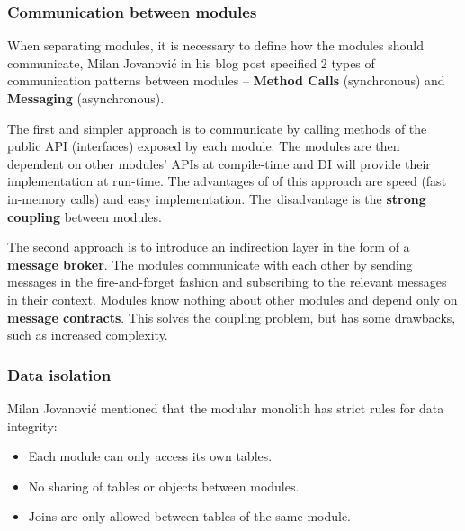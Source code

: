 \subsubsection{Communication between modules}
When separating modules, it is necessary to define how the modules should communicate, Milan Jovanović in his blog post \cite{milan_jovanovic:modular_monolith_communication_patterns} specified 2 types of communication patterns between modules -- \textbf{Method Calls} (synchronous) and \textbf{Messaging} (asynchronous).

The first and simpler approach is to communicate by calling methods of the public API (interfaces) exposed by each module. The modules are then dependent on other modules' APIs at compile-time and DI will provide their implementation at run-time. The advantages of of this approach are speed (fast in-memory calls) and easy implementation. The~disadvantage is the \textbf{strong coupling} between modules. 

The second approach is to introduce an indirection layer in the form of a \textbf{message broker}. The modules communicate with each other by sending messages in the fire-and-forget fashion and subscribing to the relevant messages in their context. Modules know nothing about other modules and depend only on \textbf{message contracts}. This solves the coupling problem, but has some drawbacks, such as increased complexity.

\subsubsection{Data isolation}
Milan Jovanović \cite{milan_jovanovic:modular_monolith_data_isolation} mentioned that the modular monolith has strict rules for data integrity:
\begin{itemize}
    \item Each module can only access its own tables.
    \item No sharing of tables or objects between modules.
    \item Joins are only allowed between tables of the same module.
\end{itemize}

